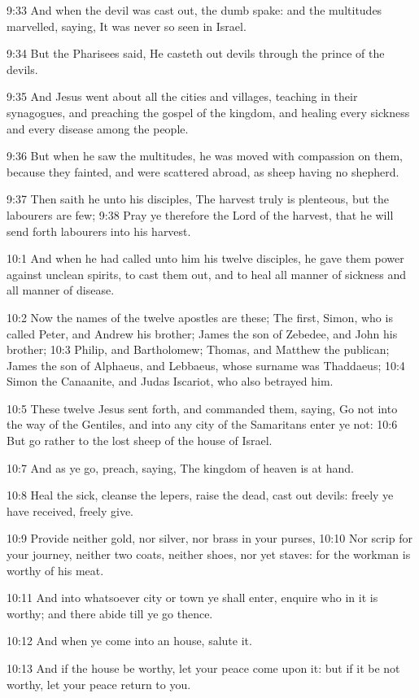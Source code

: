 9:33 And when the devil was cast out, the dumb spake: and the
multitudes marvelled, saying, It was never so seen in Israel.

9:34 But the Pharisees said, He casteth out devils through the prince
of the devils.

9:35 And Jesus went about all the cities and villages, teaching in
their synagogues, and preaching the gospel of the kingdom, and healing
every sickness and every disease among the people.

9:36 But when he saw the multitudes, he was moved with compassion on
them, because they fainted, and were scattered abroad, as sheep having
no shepherd.

9:37 Then saith he unto his disciples, The harvest truly is plenteous,
but the labourers are few; 9:38 Pray ye therefore the Lord of the
harvest, that he will send forth labourers into his harvest.

10:1 And when he had called unto him his twelve disciples, he gave
them power against unclean spirits, to cast them out, and to heal all
manner of sickness and all manner of disease.

10:2 Now the names of the twelve apostles are these; The first, Simon,
who is called Peter, and Andrew his brother; James the son of Zebedee,
and John his brother; 10:3 Philip, and Bartholomew; Thomas, and
Matthew the publican; James the son of Alphaeus, and Lebbaeus, whose
surname was Thaddaeus; 10:4 Simon the Canaanite, and Judas Iscariot,
who also betrayed him.

10:5 These twelve Jesus sent forth, and commanded them, saying, Go not
into the way of the Gentiles, and into any city of the Samaritans
enter ye not: 10:6 But go rather to the lost sheep of the house of
Israel.

10:7 And as ye go, preach, saying, The kingdom of heaven is at hand.

10:8 Heal the sick, cleanse the lepers, raise the dead, cast out
devils: freely ye have received, freely give.

10:9 Provide neither gold, nor silver, nor brass in your purses, 10:10
Nor scrip for your journey, neither two coats, neither shoes, nor yet
staves: for the workman is worthy of his meat.

10:11 And into whatsoever city or town ye shall enter, enquire who in
it is worthy; and there abide till ye go thence.

10:12 And when ye come into an house, salute it.

10:13 And if the house be worthy, let your peace come upon it: but if
it be not worthy, let your peace return to you.

